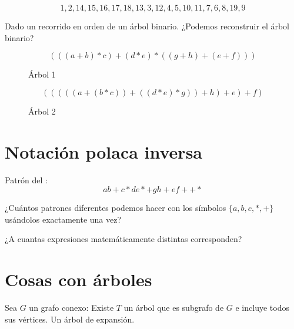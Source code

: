 \documentclass[../main.tex]{subfiles}
\begin{document}
\[
	1,2,14,15,16,17,18,13,3,12,4,5,10,11,7,6,8,19,9
\]

\begin{figure}[H]
	\centering
	
\end{figure}

Dado un recorrido en orden de un árbol binario.
¿Podemos reconstruir el árbol binario?

\[
	(((a+b)*c)+(d*e)*((g+h)+(e+f)))
\]

\begin{figure}[H]
	\bfseries
	\boldmath
	\centering
	
	\caption{Árbol 1}%
	\label{fig:arbol_1}
\end{figure}

\[
	\left(
		\left(
			\left(
				\left(
					\left(
						a +
						\left(
							b*c
						\right)
					\right)
					+
					\left(
						\left(
							d*e
						\right)
						*g
					\right)
				\right)
				+ h
			\right)
			+ e
		\right)
		+ f
	\right)
\]

\begin{figure}[H]
	\bfseries
	\boldmath
	\centering
	
	\caption{Árbol 2}%
	\label{fig:arbol_2}
\end{figure}


\section{Notación polaca inversa}%
\label{sec:notacion_polaca_inversa}

Patrón del :
\[
	ab+c*de*+gh+ef++*
\]

¿Cuántos patrones diferentes podemos hacer con los símbolos $\{a,b,c,*,+\}$
usándolos exactamente una vez?

¿A cuantas expresiones matemáticamente distintas corresponden?

\section{Cosas con árboles}%
\label{sec:cosas_con_arboles}

Sea $G$ un grafo conexo:
\teorema
\dobledef
{%
	Existe $T$ un árbol que es subgrafo de $G$ e incluye todos sus vértices.%
}
{%
	Un árbol de expansión.%
}

\begin{figure}[H]
	\centering
	
\end{figure}
\end{document}
